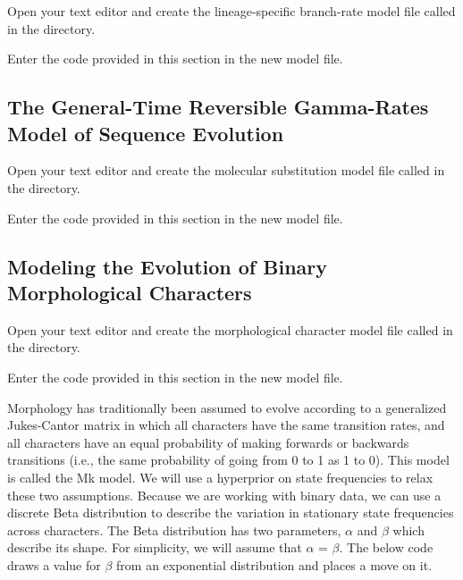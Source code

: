 {\begin{framed}
Open your text editor and create the lineage-specific branch-rate model file called {\textcolor{red}{}} in the  directory.

Enter the \Rev code provided in this section in the new model file.
\end{framed}}


\bigskip

\subsection{The General-Time Reversible Gamma-Rates Model of Sequence Evolution}\label{subsect:RB-ModelGTRG}

{\begin{framed}
Open your text editor and create the molecular substitution model file called {\textcolor{red}{}} in the  directory.

Enter the \Rev code provided in this section in the new model file.
\end{framed}}

\bigskip

\subsection{Modeling the Evolution of Binary Morphological Characters}\label{subsect:RB-ModelMorph}

{\begin{framed}
Open your text editor and create the morphological character model file called {\textcolor{red}{}} in the  directory.

Enter the \Rev code provided in this section in the new model file.
\end{framed}}

Morphology has traditionally been assumed to evolve according to a generalized Jukes-Cantor matrix in which all characters have the same transition rates, and all characters have an equal probability of making forwards or backwards transitions (i.e., the same probability of going from 0 to 1 as 1 to 0). 
This model is called the Mk model. We will use a hyperprior on state frequencies to relax these two assumptions. Because we are working with binary data, we can use a discrete Beta distribution to describe the variation in stationary state frequencies across characters. 
The Beta distribution has two parameters, $\alpha$ and $\beta$ which describe its shape. 
For simplicity, we will assume that $\alpha$ = $\beta$. 
The below code draws a value for $\beta$ from an exponential distribution and places a move on it.

